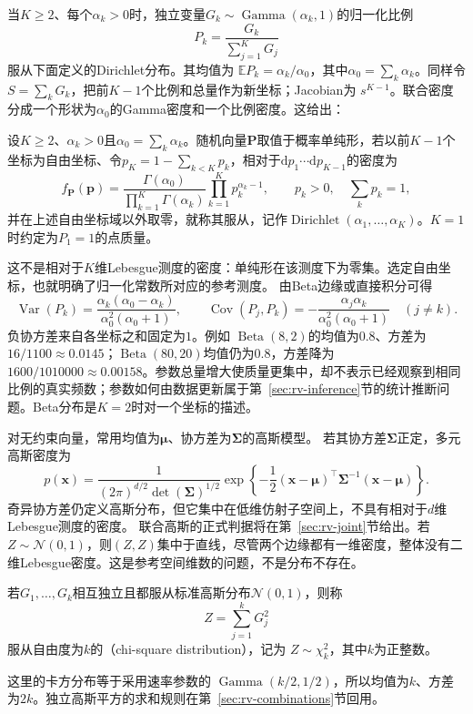 当\(K\geq2\)、每个\(\alpha_k>0\)时，独立变量\(G_k\sim\operatorname{Gamma}(\alpha_k,1)\)的归一化比例
\[ P_k=\frac{G_k}{\sum_{j=1}^{K}G_j} \]
服从下面定义的Dirichlet分布。其均值为
\(\mathbb{E}P_k=\alpha_k/\alpha_0\)，其中\(\alpha_0=\sum_k\alpha_k\)。同样令
\(S=\sum_kG_k\)，把前\(K-1\)个比例和总量作为新坐标；Jacobian为
\(s^{K-1}\)。联合密度分成一个形状为\(\alpha_0\)的Gamma密度和一个比例密度。这给出：
\begin{definition}[Dirichlet分布]
  \label{def:probability-dirichlet-distribution}
设\(K\geq2\)、\(\alpha_k>0\)且\(\alpha_0=\sum_k\alpha_k\)。随机向量\(\bm P\)取值于概率单纯形，若以前\(K-1\)个坐标为自由坐标、令\(p_K=1-\sum_{k<K}p_k\)，相对于\(\mathrm dp_1\cdots\mathrm dp_{K-1}\)的密度为
\[
  f_{\bm{P}}(\bm{p})
  =
  \frac{\Gamma(\alpha_0)}
       {\prod_{k=1}^{K}\Gamma(\alpha_k)}
  \prod_{k=1}^{K}p_k^{\alpha_k-1},
  \qquad p_k>0,\quad\sum_kp_k=1,
\]
并在上述自由坐标域以外取零，就称其服从，记作\(\operatorname{Dirichlet}(\alpha_1,\ldots,\alpha_K)\)。\(K=1\)时约定为\(P_1=1\)的点质量。
\end{definition}
这不是相对于\(K\)维Lebesgue测度的密度：单纯形在该测度下为零集。选定自由坐标，也就明确了归一化常数所对应的参考测度。
由Beta边缘或直接积分可得
\[
  \operatorname{Var}(P_k)
  =\frac{\alpha_k(\alpha_0-\alpha_k)}
        {\alpha_0^2(\alpha_0+1)},\qquad
  \operatorname{Cov}(P_j,P_k)
  =-\frac{\alpha_j\alpha_k}
         {\alpha_0^2(\alpha_0+1)}
  \quad(j\neq k).
\]
负协方差来自各坐标之和固定为\(1\)。例如
\(\operatorname{Beta}(8,2)\)的均值为\(0.8\)、方差为
\(16/1100\approx0.0145\)；\(\operatorname{Beta}(80,20)\)均值仍为\(0.8\)，方差降为
\(1600/1010000\approx0.00158\)。参数总量增大使质量更集中，却不表示已经观察到相同比例的真实频数；参数如何由数据更新属于第~\ref{sec:rv-inference}节的统计推断问题。Beta分布是\(K=2\)时对一个坐标的描述。

对无约束向量，常用均值为\(\bm\mu\)、协方差为\(\bm\Sigma\)的高斯模型。
若其协方差\(\bm{\Sigma}\)正定，多元高斯密度为
\[
  p(\bm{x})
  =
  \frac{1}{(2\pi)^{d/2}\det(\bm{\Sigma})^{1/2}}
  \exp\left\{
    -\frac12
    (\bm{x}-\bm{\mu})^{\top}
    \bm{\Sigma}^{-1}
    (\bm{x}-\bm{\mu})
  \right\}.
\]
奇异协方差仍定义高斯分布，但它集中在低维仿射子空间上，不具有相对于\(d\)维Lebesgue测度的密度。
联合高斯的正式判据将在第~\ref{sec:rv-joint}节给出。若
\(Z\sim\mathcal N(0,1)\)，则\((Z,Z)\)集中于直线，尽管两个边缘都有一维密度，整体没有二维Lebesgue密度。这是参考空间维数的问题，不是分布不存在。
\begin{definition}[卡方分布]
  \label{def:probability-chi-square-distribution}
若\(G_1,\ldots,G_k\)相互独立且都服从标准高斯分布\(\mathcal N(0,1)\)，则称
\[
  Z=\sum_{j=1}^{k}G_j^2
\]
服从自由度为\(k\)的（chi-square distribution），记为
\(Z\sim\chi_k^2\)，其中\(k\)为正整数。
\end{definition}
这里的卡方分布等于采用速率参数的
\(\operatorname{Gamma}(k/2,1/2)\)，所以均值为\(k\)、方差为\(2k\)。独立高斯平方的求和规则在第~\ref{sec:rv-combinations}节回用。

